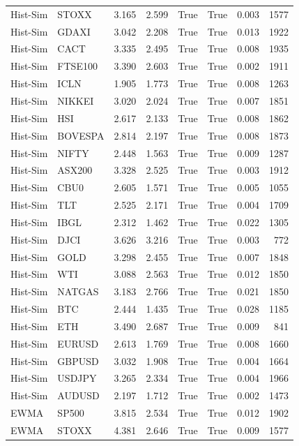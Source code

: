 \begin{table}[H]
\begin{tabular}{llrrrrrr}
Hist-Sim & STOXX & 3.165 & 2.599 & True & True & 0.003 & 1577 \\
Hist-Sim & GDAXI & 3.042 & 2.208 & True & True & 0.013 & 1922 \\
Hist-Sim & CACT & 3.335 & 2.495 & True & True & 0.008 & 1935 \\
Hist-Sim & FTSE100 & 3.390 & 2.603 & True & True & 0.002 & 1911 \\
Hist-Sim & ICLN & 1.905 & 1.773 & True & True & 0.008 & 1263 \\
Hist-Sim & NIKKEI & 3.020 & 2.024 & True & True & 0.007 & 1851 \\
Hist-Sim & HSI & 2.617 & 2.133 & True & True & 0.008 & 1862 \\
Hist-Sim & BOVESPA & 2.814 & 2.197 & True & True & 0.008 & 1873 \\
Hist-Sim & NIFTY & 2.448 & 1.563 & True & True & 0.009 & 1287 \\
Hist-Sim & ASX200 & 3.328 & 2.525 & True & True & 0.003 & 1912 \\
Hist-Sim & CBU0 & 2.605 & 1.571 & True & True & 0.005 & 1055 \\
Hist-Sim & TLT & 2.525 & 2.171 & True & True & 0.004 & 1709 \\
Hist-Sim & IBGL & 2.312 & 1.462 & True & True & 0.022 & 1305 \\
Hist-Sim & DJCI & 3.626 & 3.216 & True & True & 0.003 & 772 \\
Hist-Sim & GOLD & 3.298 & 2.455 & True & True & 0.007 & 1848 \\
Hist-Sim & WTI & 3.088 & 2.563 & True & True & 0.012 & 1850 \\
Hist-Sim & NATGAS & 3.183 & 2.766 & True & True & 0.021 & 1850 \\
Hist-Sim & BTC & 2.444 & 1.435 & True & True & 0.028 & 1185 \\
Hist-Sim & ETH & 3.490 & 2.687 & True & True & 0.009 & 841 \\
Hist-Sim & EURUSD & 2.613 & 1.769 & True & True & 0.008 & 1660 \\
Hist-Sim & GBPUSD & 3.032 & 1.908 & True & True & 0.004 & 1664 \\
Hist-Sim & USDJPY & 3.265 & 2.334 & True & True & 0.004 & 1966 \\
Hist-Sim & AUDUSD & 2.197 & 1.712 & True & True & 0.002 & 1473 \\
EWMA & SP500 & 3.815 & 2.534 & True & True & 0.012 & 1902 \\
EWMA & STOXX & 4.381 & 2.646 & True & True & 0.009 & 1577 \\

\end{tabular}
\end{table}
